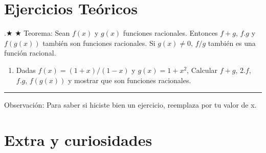 \documentclass[a4paper,11pt,spanish,sans]{exam}
\begin{document}
\section{Ejercicios Teóricos}.$\bigstar$  $\bigstar$
Teorema: Sean $f(x)$ y $g(x)$ funciones racionales. Entonces $f+g$, $f.g$ y $f(g(x))$ también son funciones racionales. Si $g(x) \neq 0 $, $f/g$ también es una función racional.


\begin{enumerate}

\item Dadas $f(x)=(1+x)/(1-x)$ y $g(x)=1+x^2$, Calcular $f+g$, $2.f$, $f.g$, $f(g(x))$ y mostrar que son funciones racionales.

\end{enumerate}



\rule[2ex]{\textwidth}{2pt}


Observación: Para saber si hiciste bien un ejercicio, reemplaza por tu valor de x.



\section*{Extra y curiosidades}
\end{document}
